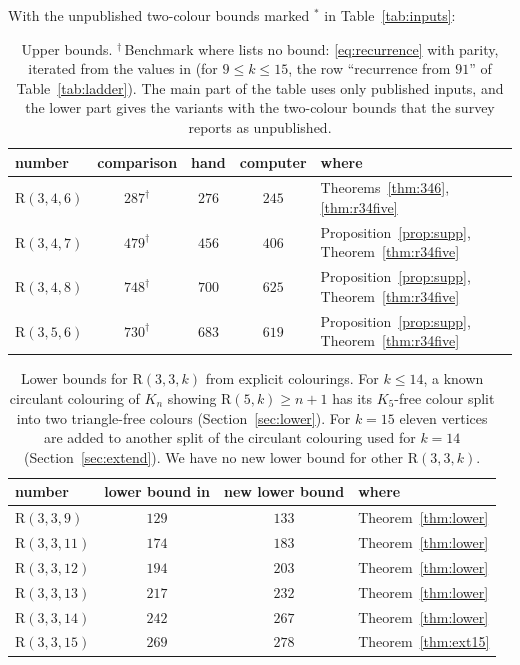 \documentclass[11pt]{article}
\theoremstyle{spacedplain}
\theoremstyle{spaceddef}
\theoremstyle{spacedremark}
\newcommand{\R}{\mathrm{R}}
\begin{document}
\begin{table}[t]
\medskip
With the unpublished two-colour bounds marked $^*$ in Table~\ref{tab:inputs}:
\smallskip

\begin{tabular}{lcccl}
\toprule
number & comparison & hand & computer & where\\
\midrule
$\R(3,4,6)$ & $287^\dagger$ & $276$ & $245$ & Theorems~\ref{thm:346}, \ref{thm:r34five}\\
$\R(3,4,7)$ & $479^\dagger$ & $456$ & $406$ & Proposition~\ref{prop:supp}, Theorem~\ref{thm:r34five}\\
$\R(3,4,8)$ & $748^\dagger$ & $700$ & $625$ & Proposition~\ref{prop:supp}, Theorem~\ref{thm:r34five}\\
$\R(3,5,6)$ & $730^\dagger$ & $683$ & $619$ & Proposition~\ref{prop:supp}, Theorem~\ref{thm:r34five}\\
\bottomrule
\end{tabular}
\caption{Upper bounds.
$^\dagger$\,Benchmark where \cite{Rad26} lists no bound: \eqref{eq:recurrence} with parity, iterated from the values in \cite{Rad26,Boz26} (for $9\le k\le 15$, the row ``recurrence from $91$'' of Table~\ref{tab:ladder}).
The main part of the table uses only published inputs, and the lower part gives the variants with the two-colour bounds that the survey reports as unpublished.}
\label{tab:upper}
\end{table}

\begin{table}[t]
\centering
\begin{tabular}{lccl}
\toprule
number & lower bound in \cite{Rad26} & new lower bound & where\\
\midrule
$\R(3,3,9)$ & $129$ & $133$ & Theorem~\ref{thm:lower}\\
$\R(3,3,11)$ & $174$ & $183$ & Theorem~\ref{thm:lower}\\
$\R(3,3,12)$ & $194$ & $203$ & Theorem~\ref{thm:lower}\\
$\R(3,3,13)$ & $217$ & $232$ & Theorem~\ref{thm:lower}\\
$\R(3,3,14)$ & $242$ & $267$ & Theorem~\ref{thm:lower}\\
$\R(3,3,15)$ & $269$ & $278$ & Theorem~\ref{thm:ext15}\\
\bottomrule
\end{tabular}
\caption{Lower bounds for $\R(3,3,k)$ from explicit colourings.
For $k\le 14$, a known circulant colouring of $K_n$ showing $\R(5,k)\ge n+1$ has its $K_5$-free colour split into two triangle-free colours (Section~\ref{sec:lower}).
For $k=15$ eleven vertices are added to another split of the circulant colouring used for $k=14$ (Section~\ref{sec:extend}).
We have no new lower bound for other $\R(3,3,k)$.}
\label{tab:lower}
\end{table}
\end{document}
